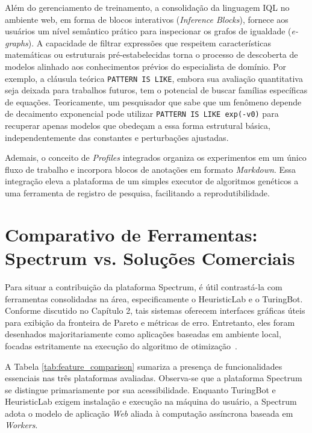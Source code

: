 Além do gerenciamento de treinamento, a consolidação da linguagem IQL no ambiente web, em forma de blocos interativos (\textit{Inference Blocks}), fornece aos usuários um nível semântico prático para inspecionar os grafos de igualdade (\textit{e-graphs}). A capacidade de filtrar expressões que respeitem características matemáticas ou estruturais pré-estabelecidas torna o processo de descoberta de modelos alinhado aos conhecimentos prévios do especialista de domínio. Por exemplo, a cláusula teórica \texttt{PATTERN IS LIKE}, embora sua avaliação quantitativa seja deixada para trabalhos futuros, tem o potencial de buscar famílias específicas de equações. Teoricamente, um pesquisador que sabe que um fenômeno depende de decaimento exponencial pode utilizar \texttt{PATTERN IS LIKE exp(-v0)} para recuperar apenas modelos que obedeçam a essa forma estrutural básica, independentemente das constantes e perturbações ajustadas.

Ademais, o conceito de \textit{Profiles} integrados organiza os experimentos em um único fluxo de trabalho e incorpora blocos de anotações em formato \textit{Markdown}. Essa integração eleva a plataforma de um simples executor de algoritmos genéticos a uma ferramenta de registro de pesquisa, facilitando a reprodutibilidade.

\section{Comparativo de Ferramentas: Spectrum vs. Soluções Comerciais}
\label{sec:results_comparison}
Para situar a contribuição da plataforma Spectrum, é útil contrastá-la com ferramentas consolidadas na área, especificamente o HeuristicLab e o TuringBot. Conforme discutido no Capítulo 2, tais sistemas oferecem interfaces gráficas úteis para exibição da fronteira de Pareto e métricas de erro. Entretanto, eles foram desenhados majoritariamente como aplicações baseadas em ambiente local, focadas estritamente na execução do algoritmo de otimização~\cite{heuristiclabDocumentationAboutHeuristicLabx2013, turingbot2020}.

A Tabela \ref{tab:feature_comparison} sumariza a presença de funcionalidades essenciais nas três plataformas avaliadas. Observa-se que a plataforma Spectrum se distingue primariamente por sua acessibilidade. Enquanto TuringBot e HeuristicLab exigem instalação e execução na máquina do usuário, a Spectrum adota o modelo de aplicação \textit{Web} aliada à computação assíncrona baseada em \textit{Workers}.

